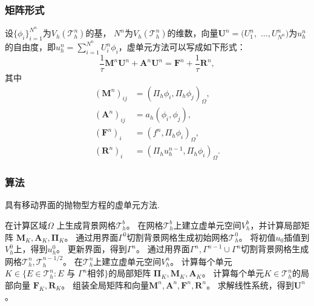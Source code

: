 \documentclass[notheorems,serif]{beamer}
\begin{document}
\begin{frame}
    \frametitle{矩阵形式}
设$\{\phi_i\}_{i=1}^{N^n}$为$V_h(\mathcal{T}^n_h)$的基，
$N^n$为$V_h(\mathcal{T}^n_h)$的维数，向量$\boldsymbol{U}^n
= (U^n_1,$ $\dots, U^n_{N^n})$为$u_h^n$的自由度，即$u_h^n = \sum_{i=1}^{N^n} U^n_i
\phi_i$，虚单元方法可以写成如下形式：
\begin{equation}
\label{matrixform}
\frac{1}{\tau}\boldsymbol{M}^n \boldsymbol{U}^n + \boldsymbol{A}^n \boldsymbol{U}^n =
\boldsymbol{F}^n + \frac{1}{\tau}\boldsymbol{R}^n,
\end{equation}
其中
$$
\begin{aligned}
(\boldsymbol{M}^n)_{ij} & = (\Pi_h \phi_i, \Pi_h \phi_j)_{\Omega},\\
(\boldsymbol{A}^n)_{ij} & = a_h(\phi_i, \phi_j),\\
(\boldsymbol{F}^n)_i & = (f^n, \Pi_h \phi_i)_{\Omega},\\
(\boldsymbol{R}^n)_i & = (\Pi_h u_h^{n-1}, \Pi_h \phi_i)_{\Omega}.
\end{aligned}
$$
\end{frame}

\begin{frame}
  \frametitle{算法}
\begin{algorithm}[H]
\caption{具有移动界面的抛物型方程的虚单元方法.}
\begin{algorithmic}[1]
\State 在计算区域$\Omega$ 上生成背景网格$\mathcal{T}_h^b$。
\State 在网格$\mathcal{T}_h^b$上建立虚单元空间$V_h^b$，并计算局部矩阵
    $\boldsymbol{M}_K, \boldsymbol{A}_K, \boldsymbol{\Pi}_K$。
\State 通过用界面$\Gamma^0$切割背景网格生成初始网格$\mathcal{T}_h^0$。
\State 将初值$u_0$插值到$V_h^0$上，得到$u_h^0$。
\State 更新界面，得到$\Gamma^{n}$。
\State 通过用界面$\Gamma^n, \Gamma^{n-1}\cup\Gamma^n$切割背景网格生成网格$\mathcal{T}_h^n, \mathcal{T}_h^{n-1/2}$。
\State 在$\mathcal{T}_h^n$上建立虚单元空间$V_h^n$。
\State 计算每个单元$K \in \{E \in \mathcal{T}_h^n: E \textrm{ 与 } \Gamma^n \textrm{相邻}\}$的局部矩阵
    $\boldsymbol{\Pi}_K, \boldsymbol{M}_K, \boldsymbol{A}_K$。
\State 计算每个单元$K \in \mathcal{T}_h^n$的局部向量
    $\boldsymbol{F}_K, \boldsymbol{R}_K$。
\State 组装全局矩阵和向量$\boldsymbol{M}^n, \boldsymbol{A}^n, \boldsymbol{F}^n, \boldsymbol{R}^n$。
\State 求解线性系统，得到$\boldsymbol{U}^n$。
\EndFor
\end{algorithmic}
\end{algorithm}
\end{frame}
\end{document}
